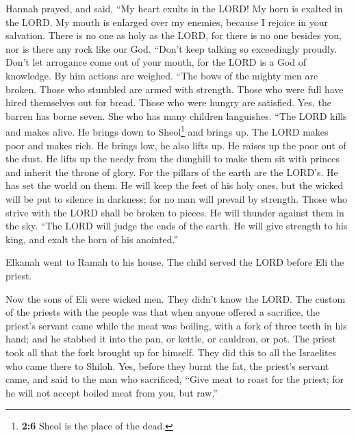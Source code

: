 Hannah prayed, and said, ``My heart exults in the LORD!
My horn is exalted in the LORD. My mouth is enlarged over my enemies,
because I rejoice in your salvation.  There is no one as
holy as the LORD, for there is no one besides you, nor is there any rock
like our God.  ``Don't keep talking so exceedingly
proudly. Don't let arrogance come out of your mouth, for the LORD is a
God of knowledge. By him actions are weighed.  ``The bows
of the mighty men are broken. Those who stumbled are armed with
strength.  Those who were full have hired themselves out
for bread. Those who were hungry are satisfied. Yes, the barren has
borne seven. She who has many children languishes.  ``The
LORD kills and makes alive. He brings down to Sheol\footnote{\textbf{2:6}
  Sheol is the place of the dead.} and brings up.  The
LORD makes poor and makes rich. He brings low, he also lifts up.
 He raises up the poor out of the dust. He lifts up the
needy from the dunghill to make them sit with princes and inherit the
throne of glory. For the pillars of the earth are the LORD's. He has set
the world on them.  He will keep the feet of his holy
ones, but the wicked will be put to silence in darkness; for no man will
prevail by strength.  Those who strive with the LORD
shall be broken to pieces. He will thunder against them in the sky.
``The LORD will judge the ends of the earth. He will give strength to
his king, and exalt the horn of his anointed.''

 Elkanah went to Ramah to his house. The child served the
LORD before Eli the priest.

 Now the sons of Eli were wicked men. They didn't know
the LORD.  The custom of the priests with the people was
that when anyone offered a sacrifice, the priest's servant came while
the meat was boiling, with a fork of three teeth in his hand;
 and he stabbed it into the pan, or kettle, or cauldron,
or pot. The priest took all that the fork brought up for himself. They
did this to all the Israelites who came there to Shiloh. 
Yes, before they burnt the fat, the priest's servant came, and said to
the man who sacrificed, ``Give meat to roast for the priest; for he will
not accept boiled meat from you, but raw.''

